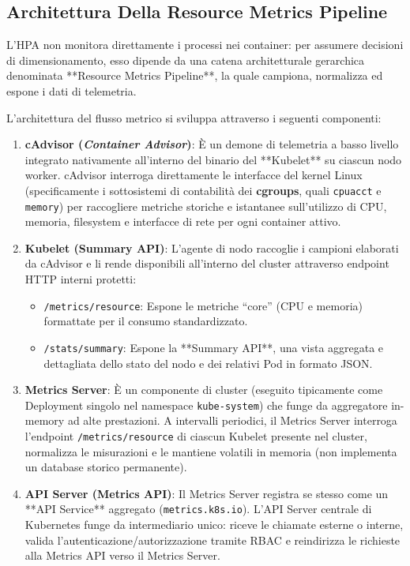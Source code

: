 \documentclass[11pt, a4paper]{article}
\begin{document}
\subsection{Architettura Della Resource Metrics Pipeline}
L'HPA non monitora direttamente i processi nei container: per assumere decisioni di dimensionamento, esso dipende da una catena architetturale gerarchica denominata **Resource Metrics Pipeline**, la quale campiona, normalizza ed espone i dati di telemetria.


L'architettura del flusso metrico si sviluppa attraverso i seguenti componenti:
\begin{enumerate}
    \item \textbf{cAdvisor (\emph{Container Advisor})}: È un demone di telemetria a basso livello integrato nativamente all'interno del binario del **Kubelet** su ciascun nodo worker. cAdvisor interroga direttamente le interfacce del kernel Linux (specificamente i sottosistemi di contabilità dei \textbf{cgroups}, quali \texttt{cpuacct} e \texttt{memory}) per raccogliere metriche storiche e istantanee sull'utilizzo di CPU, memoria, filesystem e interfacce di rete per ogni container attivo.
    \item \textbf{Kubelet (Summary API)}: L'agente di nodo raccoglie i campioni elaborati da cAdvisor e li rende disponibili all'interno del cluster attraverso endpoint HTTP interni protetti:
    \begin{itemize}[noitemsep]
        \item \texttt{/metrics/resource}: Espone le metriche ``core'' (CPU e memoria) formattate per il consumo standardizzato.
        \item \texttt{/stats/summary}: Espone la **Summary API**, una vista aggregata e dettagliata dello stato del nodo e dei relativi Pod in formato JSON.
    \end{itemize}
    \item \textbf{Metrics Server}: È un componente di cluster (eseguito tipicamente come Deployment singolo nel namespace \texttt{kube-system}) che funge da aggregatore in-memory ad alte prestazioni. A intervalli periodici, il Metrics Server interroga l'endpoint \texttt{/metrics/resource} di ciascun Kubelet presente nel cluster, normalizza le misurazioni e le mantiene volatili in memoria (non implementa un database storico permanente).
    \item \textbf{API Server (Metrics API)}: Il Metrics Server registra se stesso come un **API Service** aggregato (\texttt{metrics.k8s.io}). L'API Server centrale di Kubernetes funge da intermediario unico: riceve le chiamate esterne o interne, valida l'autenticazione/autorizzazione tramite RBAC e reindirizza le richieste alla Metrics API verso il Metrics Server.
\end{enumerate}
\end{document}
